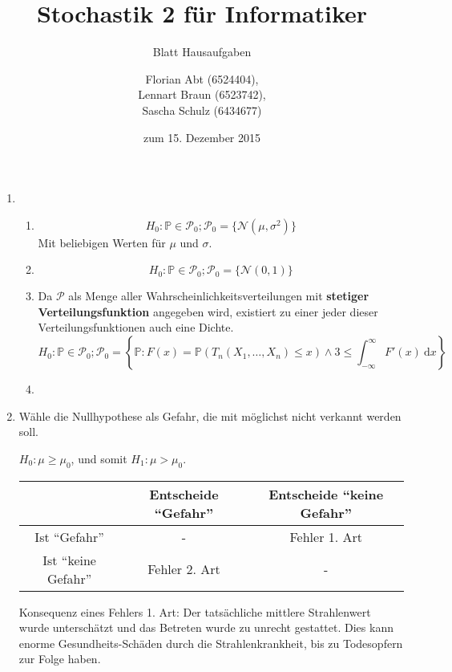 \documentclass[a4paper]{scrartcl}
\title{Stochastik 2 für Informatiker}
\subtitle{Blatt {\blattnr} Hausaufgaben}
\author{
    Florian Abt (6524404), \\
    Lennart Braun (6523742), \\
    Sascha Schulz (6434677)
}
\date{zum 15. Dezember 2015}
\newcommand{\dif}{\ \mathrm{d}}
\def \blattnr {9}
\begin{document}
\maketitle

\begin{enumerate}[label=\bfseries \blattnr.\arabic*]

    \item 
      \begin{enumerate}
       \item 
        \begin{equation*}
	  H_0: \mathbb{P} \in \mathcal{P}_0; \mathcal{P}_0 = \{ \mathcal{N}(\mu,\sigma^2) \}
	\end{equation*}
	Mit beliebigen Werten für $\mu$ und $\sigma$.
       \item 
	\begin{equation*}
	  H_0: \mathbb{P} \in \mathcal{P}_0; \mathcal{P}_0 = \{ \mathcal{N}(0,1) \}
	\end{equation*}
       \item 
	Da $\mathcal{P}$ als Menge aller Wahrscheinlichkeitsverteilungen mit 
	\textbf{stetiger Verteilungsfunktion} angegeben wird, existiert zu einer 
	jeder dieser Verteilungsfunktionen auch eine Dichte.
	\begin{equation*}
	  H_0: \mathbb{P} \in \mathcal{P}_0; \mathcal{P}_0 = 
	   \left\{ \mathbb{P} : F(x)=\mathbb{P}(T_n(X_1,\ldots,X_n) \leq x) \wedge 3 \leq \int_{-\infty}^{\infty} F'(x) \dif x \right\}
	\end{equation*}
       \item 
      \end{enumerate}

    \item 
      Wähle die Nullhypothese als Gefahr, die mit möglichst nicht verkannt werden soll.
      
      $H_0: \mu \geq \mu_0$, und somit $H_1: \mu>\mu_0$.
      
      \begin{tabular}{c|c|c}
        & Entscheide ``Gefahr'' & Entscheide ``keine Gefahr'' \\
        \hline
       Ist ``Gefahr'' & - & Fehler 1. Art \\
       Ist ``keine Gefahr'' & Fehler 2. Art & - 
      \end{tabular}

    
      Konsequenz eines Fehlers 1. Art: Der tatsächliche mittlere Strahlenwert wurde unterschätzt und das Betreten wurde zu unrecht 
      gestattet. Dies kann enorme Gesundheits-Schäden durch die Strahlenkrankheit, bis zu Todesopfern zur Folge haben.
      

\end{enumerate}
\end{document}
